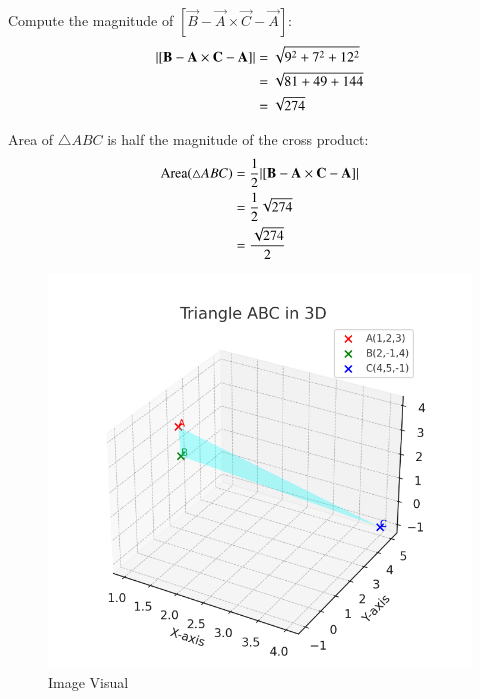 \documentclass[journal]{IEEEtran}
\begin{document}
Compute the magnitude of $[\vec{B}-\vec{A} \times \vec{C}-\vec{A}]$:
\begin{align}
|[\vec{B}-\vec{A} \times \vec{C}-\vec{A}]| &= \sqrt{9^2 + 7^2 + 12^2} \notag \\
&= \sqrt{81 + 49 + 144} \notag \\
&= \sqrt{274} \label{eq:4}
\end{align}

 Area of $\triangle ABC$ is half the magnitude of the cross product:
\begin{align}
\text{Area}(\triangle ABC) &= \frac{1}{2} |[\vec{B}-\vec{A} \times \vec{C}-\vec{A}]| \notag \\
&= \frac{1}{2} \sqrt{274} \notag \\
&= \frac{\sqrt{274}}{2} \label{eq:5}
\end{align}
\begin{figure}[H]
    \centering
    \includegraphics[width=0.5\linewidth]{figs/image.png}
    \caption{Image Visual}
    \label{fig:figs/image.png}
\end{figure}
\end{document}
